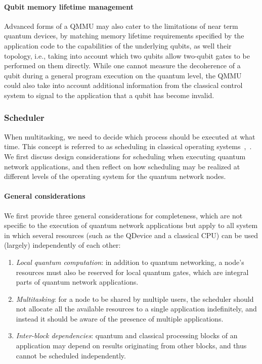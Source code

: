 \paragraph{Qubit memory lifetime management}

Advanced forms of a \ac{QMMU} may also cater to the limitations of near term quantum devices, by matching memory lifetime requirements specified by the application code to the capabilities of the underlying qubits, as well their topology, i.e., taking into account which two qubits allow two-qubit gates to be performed on them directly. While one cannot measure the decoherence of a qubit during a general program execution on the quantum level, the \ac{QMMU} could also take into account additional information from the classical control system to signal to the application that a qubit has become invalid.

\subsubsection{Scheduler}

When multitasking, we need to decide which process should be executed at what time. This concept is referred to as  scheduling in classical operating systems~\cite[Section 2.4]{tanenbaum_operating_2005},~\cite[Section 3.2]{silberschatz_book_2014}. We first discuss design considerations for scheduling when executing quantum network applications, and then reflect on how scheduling may be realized at different levels of the operating system for the quantum network nodes. 

\paragraph{General considerations}

We first provide three general considerations for completeness, which are not specific to the execution of quantum network applications but apply to all system in which several resources (such as the \ac{QDevice} and a classical \ac{CPU}) can be used (largely) independently of each other:
%
\begin{enumerate}
\item \emph{Local quantum computation}: in addition to quantum networking, a node's resources must also be reserved for local quantum gates, which are integral parts of quantum network applications.
\item \emph{Multitasking}: for a node to be shared by multiple users, the scheduler should not allocate all the available resources to a single application indefinitely, and instead it should be aware of the presence of multiple applications.
\item \emph{Inter-block dependencies}: quantum and classical processing blocks of an application may depend on results originating from other blocks, and thus cannot be scheduled independently.
\end{enumerate}

